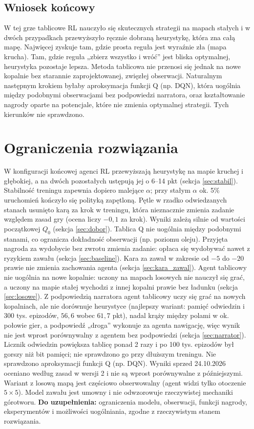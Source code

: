 \documentclass[11pt,a4paper]{article}
\newcommand{\doUzupelnienia}[1]{\textbf{Do uzupełnienia:} #1}
\begin{document}
\subsection{Wniosek końcowy}
W tej grze tablicowe RL nauczyło się skutecznych strategii na mapach stałych
i w dwóch przypadkach przewyższyło ręcznie dobraną heurystykę, która zna całą mapę.
Najwięcej zyskuje tam, gdzie prosta reguła jest wyraźnie zła (mapa krucha). Tam,
gdzie reguła „zbierz wszystko i wróć” jest bliska optymalnej, heurystyka pozostaje
lepsza. Metoda tablicowa nie przenosi się jednak na nowe kopalnie bez starannie
zaprojektowanej, zwięzłej obserwacji. Naturalnym następnym krokiem byłaby
aproksymacja funkcji Q (np. DQN), która uogólnia między podobnymi obserwacjami bez
podpowiedzi narratora, oraz kształtowanie nagrody oparte na potencjale, które nie
zmienia optymalnej strategii. Tych kierunków nie sprawdzono.

\section{Ograniczenia rozwiązania}
W konfiguracji końcowej agenci RL przewyższają heurystykę na mapie kruchej
i głębokiej, a na dwóch pozostałych ustępują jej o 6--14 pkt (sekcja \ref{sec:stabil}).
Stabilność treningu zapewnia dopiero malejące $\alpha$; przy stałym $\alpha$ ok. 5\%
uruchomień kończyło się polityką zapętloną. Pętle w rzadko odwiedzanych stanach
usunięto karą za krok w treningu, która nieznacznie zmienia zadanie względem zasad
gry (ocena liczy $-0{,}1$ za krok). Wyniki zależą silnie od wartości początkowej $Q_0$ (sekcja
\ref{sec:dobor}). Tablica Q nie uogólnia między podobnymi stanami, co ogranicza
dokładność obserwacji (np. poziomu oleju). Przyjęta nagroda za wydobycie bez zwrotu
zmienia zadanie: opłaca się wydobywać nawet z ryzykiem zawału (sekcja
\ref{sec:baseline}). Kara za zawał w zakresie od $-5$ do $-20$ prawie nie zmienia
zachowania agenta (sekcja \ref{sec:kara_zawal}). Agent tablicowy nie uogólnia na
nowe kopalnie: uczony na mapach losowych nie nauczył się grać, a uczony na mapie
stałej wychodzi z innej kopalni prawie bez ładunku (sekcja \ref{sec:losowe}).
Z podpowiedzią narratora agent tablicowy uczy się grać na nowych kopalniach, ale
nie dorównuje heurystyce (najlepszy wariant: pamięć odwiedzin i 300 tys. epizodów,
$56{,}6$ wobec $61{,}7$ pkt), nadal krąży między polami w ok. połowie gier, a podpowiedź
„droga” wykonuje za agenta
nawigację, więc wynik nie jest wprost porównywalny z agentem bez podpowiedzi
(sekcja \ref{sec:narrator}). Licznik odwiedzin powiększa tablicę ponad 2 razy i po
100 tys. epizodów był gorszy niż bit pamięci; nie sprawdzono go przy dłuższym treningu. Nie sprawdzono aproksymacji funkcji Q (np. DQN). Wyniki sprzed 24.10.2026 oceniano według zasad w wersji 2
i nie są wprost porównywalne z późniejszymi.
Wariant z losową mapą jest częściowo obserwowalny (agent widzi tylko otoczenie
$5\times 5$). Model zawału jest umowny i nie odwzorowuje rzeczywistej mechaniki
górotworu.
\doUzupelnienia{ograniczenia modelu, obserwacji, funkcji nagrody, eksperymentów
i możliwości uogólniania, zgodne z rzeczywistym stanem rozwiązania.}
\end{document}
